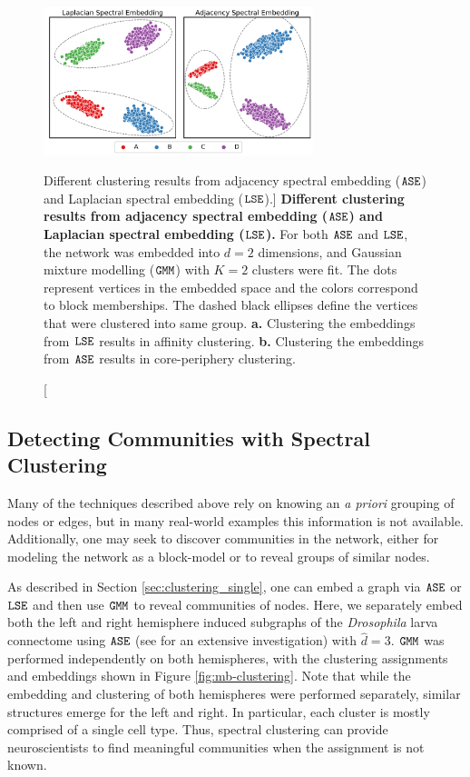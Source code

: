 \begin{figure}
    \centering
    \includegraphics[width=0.7\textwidth]{figures/dnd/two_truths}
    \caption
    [Different clustering results from adjacency spectral embedding ($\operatorname{\mathtt{ASE}}$) and Laplacian spectral embedding ($\operatorname{\mathtt{LSE}}$).]
    {\textbf{Different clustering results from adjacency spectral embedding ($\operatorname{\mathtt{ASE}}$) and Laplacian spectral embedding ($\operatorname{\mathtt{LSE}}$).} For both $\operatorname{\mathtt{ASE}}$ and $\operatorname{\mathtt{LSE}}$, the network was embedded into $d=2$ dimensions, and Gaussian mixture modelling ($\operatorname{\mathtt{GMM}}$) with $K=2$ clusters were fit. The dots represent vertices in the embedded space and the colors correspond to block memberships. The dashed black ellipses define the vertices that were clustered into same group.
    \textbf{a.} Clustering the embeddings from $\operatorname{\mathtt{LSE}}$ results in affinity clustering. 
    \textbf{b.} Clustering the embeddings from $\operatorname{\mathtt{ASE}}$ results in core-periphery clustering.}
    \label{fig:exp8}
\end{figure}

\subsection{Detecting Communities with Spectral Clustering}
Many of the techniques described above rely on knowing an \textit{a priori} grouping of nodes or edges, but in many real-world examples this information is not available. Additionally, one may seek to discover communities in the network, either for modeling the network as a block-model or to reveal groups of similar nodes. 

As described in Section \ref{sec:clustering_single}, one can embed a graph via $\operatorname{\mathtt{ASE}}$ or $\operatorname{\mathtt{LSE}}$ and then use $\operatorname{\mathtt{GMM}}$ to reveal communities of nodes. Here, we separately embed both the left and right hemisphere induced subgraphs of the \textit{Drosophila} larva connectome using $\operatorname{\mathtt{ASE}}$ (see \cite{priebe2017semiparametric} for an extensive investigation) with $\hat d= 3$. $\operatorname{\mathtt{GMM}}$ was performed independently on both hemispheres, with the clustering assignments and embeddings shown in Figure \ref{fig:mb-clustering}. Note that while the embedding and clustering of both hemispheres were performed separately, similar structures emerge for the left and right. In particular, each cluster is mostly comprised of a single cell type. Thus, spectral clustering can provide neuroscientists to find meaningful communities when the assignment is not known. 

